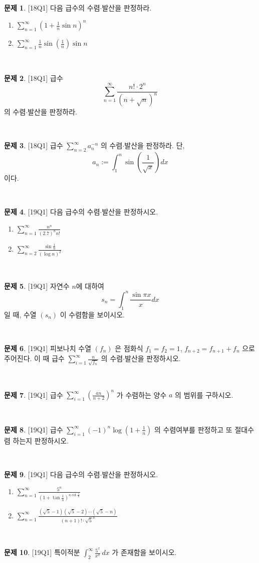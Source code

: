 \documentclass[12pt]{article}
\newcommand{\ds}{\displaystyle}
\theoremstyle{definition}
\newtheorem{problem}{\sffamily 문제}[section]
\newcommand{\prob}[2]{\begin{problem}{[\sffamily #1]} #2\end{problem}~}
\begin{document}
\prob{18Q1}{다음 급수의 수렴$\cdot$발산을 판정하라.
\begin{enumerate}
	\item $\displaystyle \sum_{n=1}^\infty \left(1+\frac{1}{n} \sin{n}\right)^n$
	\item $\displaystyle \sum_{n=1}^\infty \frac{1}{n}\sin{\left(\frac{1}{n}\right)}\sin{n}$
\end{enumerate}
}

\prob{18Q1}{급수 $$\sum_{n=1}^\infty \frac{n!\cdot 2^n}{\left(n+\sqrt{n}\right)^n}$$의 수렴$\cdot$발산을 판정하라.}

\prob{18Q1}{급수 $\displaystyle \sum_{n=2}^\infty a_n^{-n}$ 의 수렴$\cdot$발산을 판정하라. 단, $$a_n := \int_1^n \sin{\left(\frac{1}{\sqrt{x}}\right)}dx$$이다.}

\prob{19Q1}{다음 급수의 수렴$\cdot$발산을 판정하시오.
	\begin{enumerate}
		\item $\displaystyle \sum_{n=1}^\infty \frac{n^n}{(2.7)^nn!}$
		\item $\displaystyle \sum_{n=2}^\infty \frac{\sin \frac{1}{n}}{(\log n)^2}$
\end{enumerate}
}

\prob{19Q1}{자연수 $n$에 대하여 $$s_n = \int_1^n \frac{\sin\pi x}{x} dx$$ 일 때, 수열 $(s_n)$ 이 수렴함을 보이시오.}

\prob{19Q1}{피보나치 수열 $(f_n)$ 은 점화식 $f_1=f_2=1$, $f_{n+2}=f_{n+1}+f_n$ 으로 주어진다. 이 때 급수 $\ds \sum_{i=1}^\infty \frac{n}{\sqrt{f_n}}$ 의 수렴$\cdot$발산을 판정하시오.}

\prob{19Q1}{급수 $\ds \sum_{i=1}^\infty \left(\frac{an}{n+2}\right)^n$ 가 수렴하는 양수 $a$ 의 범위를 구하시오.}

\prob{19Q1}{급수 $\ds \sum_{i=1}^\infty (-1)^n \log\left(1+\frac{1}{n}\right)$ 의 수렴여부를 판정하고 또 절대수렴 하는지 판정하시오.}

\prob{19Q1}{다음 급수의 수렴$\cdot$발산을 판정하시오.
\begin{enumerate}
	\item $\displaystyle \sum_{n=1}^\infty \frac{5^n}{(1+\tan \frac{1}{n})^{n\cot \frac{1}{n}}}$
	\item $\displaystyle \sum_{n=1}^\infty \frac{\left(\sqrt{5}-1\right)\left(\sqrt{5}-2\right)\cdots \left(\sqrt{5}-n\right)}{(n+1)!\cdot \sqrt{5}^n}$ 
\end{enumerate}
}

\prob{19Q1}{특이적분 $\displaystyle \int_{2}^{\infty} \frac{5^x}{x^x}\, dx$ 가 존재함을 보이시오.}
\end{document}
